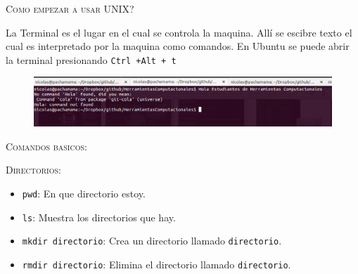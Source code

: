 \documentclass{beamer}
\begin{document}
\begin{frame}{\textsc{Como empezar a usar UNIX?}}

\begin{Large}
\textrm{La Terminal es el lugar en el cual se controla la maquina.
All\'i se escibre texto el cual es interpretado por la maquina como comandos.
En Ubuntu se puede abrir la terminal presionando \texttt{Ctrl +Alt + t }}
\end{Large}

\begin{figure}
\includegraphics[scale=0.3]{fig3.png}
\end{figure}

\end{frame}



\begin{frame}{\textsc{Comandos basicos:}}

\begin{center}
{\large \textsc{Directorios:}}
\end{center}
\begin{itemize}
\item \texttt{pwd}: \textrm{En que directorio estoy.}\\
\item \texttt{ls}: \textrm{Muestra los directorios que hay.}\\
\item \texttt{mkdir directorio}: \textrm{Crea un directorio llamado \texttt{directorio}}. 
\item \texttt{rmdir directorio}: \textrm{Elimina el directorio llamado \texttt{directorio}}.
\end{itemize}

\end{frame}


\end{document}
